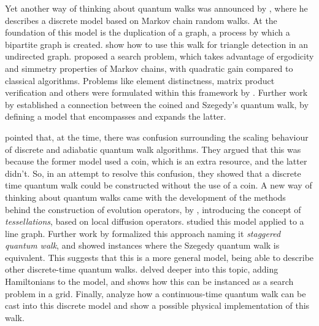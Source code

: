 \documentclass[../../dissertation.tex]{subfiles}
\begin{document}
Yet another way of thinking about quantum walks was announced by
\cite{szegedy2004}, where he describes a discrete model based on Markov chain
random walks. At the foundation of this model is the duplication of a graph, a
process by which a bipartite graph is created. \cite{magniez2005} show how to
use this walk for triangle detection in an undirected graph. \cite{magniez2006}
proposed a search problem, which takes advantage of ergodicity and simmetry
properties of Markov chains, with quadratic gain compared to classical
algorithms. Problems like element distinctness, matrix product verification and
others were formulated within this framework by \cite{santha2008}. Further work
by \cite{portugal2015} established a connection between the coined and Szegedy's quantum
walk, by defining a model that encompasses and expands the latter.\par 

\cite{patel2004} pointed that, at the time, there was confusion surrounding the
scaling behaviour of discrete and adiabatic quantum walk algorithms. They
argued that this was because the former model used a coin, which is an extra
resource, and the latter didn't. So, in an attempt to resolve this confusion,
they showed that a discrete time quantum walk could be constructed without the
use of a coin. 
A new way of thinking about quantum walks came with the
development of the methods behind the construction of evolution operators, by
\cite{falk2013}, introducing the concept of \textit{tessellations}, based on
local diffusion operators. \cite{portugal2014} studied this model applied to a
line graph.
Further work by \cite{portugal2015b} formalized this approach naming it
\textit{staggered quantum walk}, and showed instances where the Szegedy quantum
walk is equivalent. This suggests that this is a more general model, being able
to describe other discrete-time quantum walks. \cite{portugal2017b} delved
deeper into this topic, adding Hamiltonians to the model, and
\cite{portugal2017a} shows how this can be instanced as a search problem in a
grid. Finally, \cite{coutinho2017} analyze how a continuous-time quantum walk
can be cast into this discrete model and \cite{moqadam2016} show a
possible physical implementation of this walk.
\end{document}
